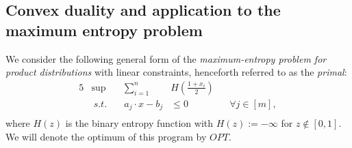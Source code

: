 \documentclass[final, 12pt]{colt2018}
\theoremstyle{definition}
\theoremstyle{plain}
\begin{document}
\subsection{Convex duality and application to the maximum entropy problem}
\begin{comment}
NOTES ON REFERENCES.
Useful brief reference describing statements of convex duality: Nikolov's paper\footnote{Randomized Rounding for the Largest Simplex Problem \url{https://arxiv.org/pdf/1412.0036.pdf}} section 2.2. Readable reference for the proof of Slater's condition (better than Rockafellar): unkown. In our case we can actually just use Von Neumann minimax theorem with concave-convex functions, shown later. END NOTES.

Here is the convex program we are interested in, where $\gamma$ is some error tolerance parameter.

\begin{alignat*}{5}
&\max\quad &\sum_{i = 1}^n &H(x_i)\\
&\ s.t.\quad&0 &\le x_i &&\le 1 &\quad& \forall i \in [n] \\
&&\overline{r_t} - \gamma n &\le \sum_{i \in R_t} x_i &&\le \overline{r_t} + \gamma n && \forall t \in [s] \\
&&\overline{c_t} - \gamma n&\le \sum_{i \in C_t} x_i &&\le \overline{c_t} + \gamma n && \forall t \in [s].
\end{alignat*}
recall $s$ is the number of big parts which is $O(1/\epsilon^2\Delta)$.
\end{comment}
We consider the following general form of the \emph{maximum-entropy problem for product distributions} with linear constraints, henceforth referred to as the \emph{primal}:
\begin{alignat*}{5}
&\sup \quad &\sum_{i = 1}^n &H\left(\frac{1+x_i}{2}\right)\\
&\ s.t. \quad &a_j \cdot x - b_j &\le 0 && \forall j \in [m], \\
\end{alignat*}
where $H(z)$ is the binary entropy function with $H(z):= -\infty$ for $z\notin [0,1]$. We will denote the optimum of this program by $OPT$. 
\end{document}
